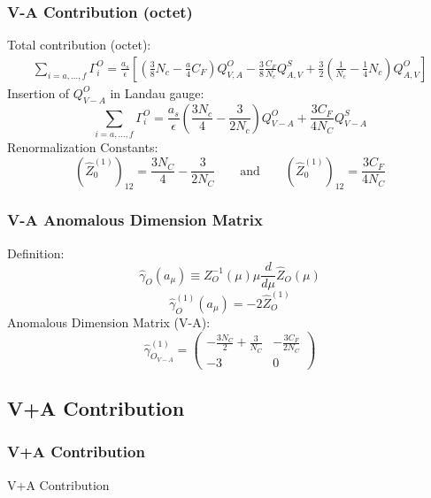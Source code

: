 \documentclass{beamer}
\begin{document}
\begin{frame}
\frametitle{V-A Contribution (octet)}
Total contribution (octet):
\small
\begin{equation*}
\begin{split}
	\sum_{i=a,\ldots,f}\Gamma^O_i = \frac{a_s}{\epsilon} \left[\left(\frac{3}{8} N_c - \frac{a}{4} C_F \right) Q^O_{V,A} - \frac{3}{8}\frac{C_F}{N_c}Q^S_{A,V} + \frac{3}{2} \left( \frac{1}{N_c} - \frac{1}{4} N_c \right ) Q^O_{A,V} \right]
\end{split}
\end{equation*}
\normalsize
Insertion of $Q^O_{V-A}$ in Landau gauge:
\begin{equation*}
	\sum_{i=a,\ldots,f}\Gamma^O_i = \frac{a_s}{\epsilon} \left(\frac{3N_c}{4}-\frac{3}{2N_c}\right) Q^O_{V-A} + \frac{3 C_F}{4 N_C} Q^S_{V-A}
\end{equation*}
Renormalization Constants:
\begin{equation*}
	(\hat Z^{(1)}_0)_{12} = \frac{3N_C}{4} - \frac{3}{2N_C} \qquad \text{and} \qquad  (\hat Z^{(1)}_0)_{12} = \frac{3C_F}{4N_C}
\end{equation*}	
\end{frame}

\begin{frame}
\frametitle{V-A Anomalous Dimension Matrix}
Definition:
\begin{equation*}
	\hat \gamma_O (a_\mu) \equiv Z^{-1}_O(\mu) \mu \frac  {d}{d\mu} \hat Z_O (\mu) 
\end{equation*}
\begin{equation*}
	\hat \gamma^{(1)}_O(a_\mu) = - 2\hat Z^{(1)}_O
\end{equation*}
Anomalous Dimension Matrix (V-A):
\begin{equation*}
	\hat \gamma^{(1)}_{O_{V-A}} = 
	\begin{pmatrix}
		-\frac{3N_C}{2}+\frac{3}{N_C} & -\frac{3C_F}{2N_C} \\
		-3 & 0
	\end{pmatrix}
\end{equation*}
\end{frame}

\subsection{V+A Contribution}
\begin{frame}
\frametitle{V+A Contribution}
\huge\centering
V+A Contribution
\end{frame}
\end{document}
